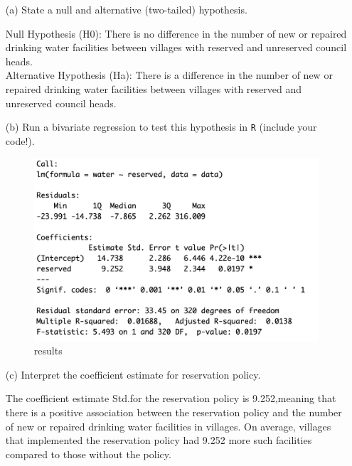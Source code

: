 \documentclass[12pt,letterpaper]{article}
\begin{document}
\newpage
\begin{enumerate}
	\item [(a)] State a null and alternative (two-tailed) hypothesis. 
	
	Null Hypothesis (H0): There is no difference in the number of new or repaired drinking water facilities between villages with reserved and unreserved council heads.\\

	Alternative Hypothesis (Ha): There is a difference in the number of new or repaired drinking water facilities between villages with reserved and unreserved council heads.\\
	
	
	\item [(b)] Run a bivariate regression to test this hypothesis in \texttt{R} (include your code!).
	 
	
	\begin{figure}[h!]\centering
		\caption{\footnotesize{results}}
		\label{fig:9}
		\includegraphics[width=.75\textwidth]{question2.b.png}
	\end{figure}
	\newpage
	\item [(c)] Interpret the coefficient estimate for reservation policy. 
	
	The coefficient estimate Std.for the reservation policy is 9.252,meaning that 
	there is a positive association between the reservation policy and the number of new or repaired drinking water facilities in villages. 
	On average, villages that implemented the reservation policy had 9.252 more such facilities compared to those without the policy.\\
	
\end{enumerate}
\end{document}

